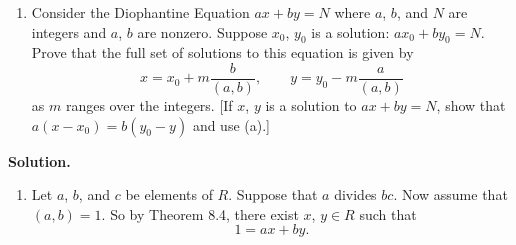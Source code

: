 \documentclass[9pt]{article}
\begin{document}
\begin{enumerate}
\begin{enumerate}
                     \item Consider the Diophantine Equation $ax + by = N$ where
                           $a$, $b$, and $N$ are integers and $a$, $b$ are
                           nonzero. Suppose $x_0$, $y_0$ is a solution:
                           $ax_0 + by_0 = N$. Prove that the full set of
                           solutions to this equation is given by
                           $$x = x_0 + m\frac{b}{(a, b)}, \qquad
                             y = y_0 - m\frac{a}{(a, b)}$$
                           as $m$ ranges over the integers. [If $x$, $y$ is a
                           solution to $ax + by = N$, show that
                           $a(x - x_0) = b(y_0 - y)$ and use (a).]
                  \end{enumerate}

      \textbf{Solution.}

      \begin{enumerate}
         \item Let $a$, $b$, and $c$ be elements of $R$. Suppose that $a$
               divides $bc$. Now assume that $(a, b) = 1$. So by Theorem 8.4, 
               there exist $x$, $y \in R$ such that
               \begin{equation} \label{1_1}
                  1 = ax + by.
               \end{equation}


\end{enumerate}
\end{enumerate}
\end{document}
